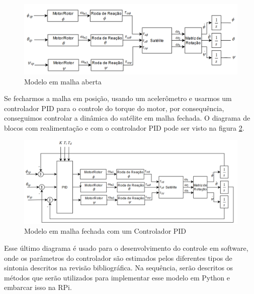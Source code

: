 \begin{figure}[H]
  \caption{Modelo em malha aberta}
  \begin{center}
      \includegraphics[scale=.55]{metodologia/img/modelo_satelite_malha_aberta}
  \end{center}
  \label{fig:modelo_satelite_malha_aberta}
\end{figure}

Se fecharmos a malha em posição, usando um acelerômetro e usarmos um controlador PID para o controle do torque do motor, por consequência, conseguimos controlar a dinâmica do satélite em malha fechada. O diagrama de blocos com realimentação e com o controlador PID pode ser visto na figura \ref{fig:modelo_satelite_pid}. 

\begin{figure}[H]
  \caption{Modelo em malha fechada com um Controlador PID}
  \begin{center}
      \includegraphics[scale=.58]{metodologia/img/modelo_satelite_pid}
  \end{center}
  \label{fig:modelo_satelite_pid}
\end{figure}

Esse último diagrama é usado para o desenvolvimento do controle em software, onde os parâmetros do controlador são estimados pelos diferentes tipos de sintonia descritos na revisão bibliográfica. Na sequência, serão descritos os métodos que serão utilizados para implementar esse modelo em Python e embarcar isso na RPi.


